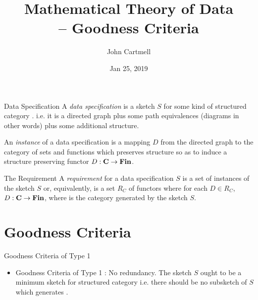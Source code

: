 \documentclass[xcolor=pst,dvips]{beamer}   %
\title[John Cartmell]{Mathematical Theory of Data \\ -- Goodness Criteria}
\author{John Cartmell}
\institute{ad otium}
\date{Jan 25, 2019}
\begin{document}
\begin{frame}
\titlepage
\end{frame}

\iffalse
\begin{frame}{Introduction}
\begin{itemize}
\item
What types of things are there and how are they related? 
\begin{itemize}
\pause \item Data specifications provide the answer to this question in the context of a software development. 
\pause \item Types theories provide the answer in the context of mathematics. 
\pause \item Category theory abstracts across both these domains.
\end{itemize}
\end{itemize}
\end{frame}
\fi

\begin{frame}{Data Specification}
A \textit{data specification} is a sketch $S$ for some kind of structured category \catc.
i.e. it is a directed graph plus some path equivalences (diagrams in other words) plus 
some additional structure.  

An \textit{instance} of a data specification is a mapping $D$ from the directed graph
to the category of sets and functions which preserves structure so as
to induce a structure preserving functor $D: \textbf{C} \rightarrow \textbf{Fin}$.
\end{frame}

\begin{frame}{The Requirement}
A \textit{requirement} for a data specification $S$ 
is a set of instances of the sketch $S$ or, equivalently, is a set $R_C$ of functors where for each
$D \in R_C$, $D: \textbf{C} \rightarrow \textbf{Fin}$, where \catcw is the category generated by the sketch $S$.
\end{frame}

\section{Goodness Criteria}
\begin{frame}{Goodness Criteria of Type 1}
\begin{itemize}
\item Goodness Criteria of Type 1 : No redundancy. The sketch $S$ ought to be a minimum sketch for structured
category \catcw i.e. there should be no subsketch of $S$ which generates  \catc.
\end{itemize}
\end{frame}
\end{document}
